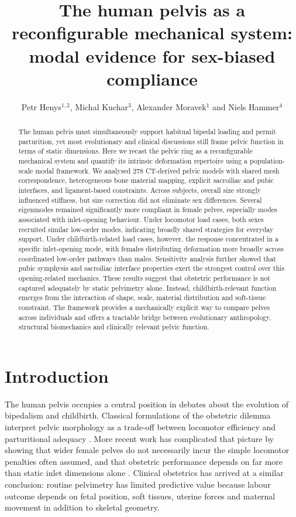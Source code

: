 \documentclass[fleqn,usenatbib]{rsproca_new}
\title[Reconfigurable mechanics of the human pelvis]{The human pelvis as a reconfigurable mechanical system: modal evidence for sex-biased compliance}
\author[Henys et al.]{
Petr Henys$^{1,2}$,
Michal Kuchar$^{3}$,
Alexander Moravek$^{1}$
and Niels Hammer$^{4}$
}
\begin{document}
\begin{abstract}
The human pelvis must simultaneously support habitual bipedal loading and permit parturition, yet most evolutionary and clinical discussions still frame pelvic function in terms of static dimensions. Here we recast the pelvic ring as a reconfigurable mechanical system and quantify its intrinsic deformation repertoire using a population-scale modal framework. We analysed 278 CT-derived pelvic models with shared mesh correspondence, heterogeneous bone material mapping, explicit sacroiliac and pubic interfaces, and ligament-based constraints. Across subjects, overall size strongly influenced stiffness, but size correction did not eliminate sex differences. Several eigenmodes remained significantly more compliant in female pelves, especially modes associated with inlet-opening behaviour. Under locomotor load cases, both sexes recruited similar low-order modes, indicating broadly shared strategies for everyday support. Under childbirth-related load cases, however, the response concentrated in a specific inlet-opening mode, with females distributing deformation more broadly across coordinated low-order pathways than males. Sensitivity analysis further showed that pubic symphysis and sacroiliac interface properties exert the strongest control over this opening-related mechanics. These results suggest that obstetric performance is not captured adequately by static pelvimetry alone. Instead, childbirth-relevant function emerges from the interaction of shape, scale, material distribution and soft-tissue constraint. The framework provides a mechanically explicit way to compare pelves across individuals and offers a tractable bridge between evolutionary anthropology, structural biomechanics and clinically relevant pelvic function.
\end{abstract}


\maketitle

\section{Introduction}
The human pelvis occupies a central position in debates about the evolution of bipedalism and childbirth. Classical formulations of the obstetric dilemma interpret pelvic morphology as a trade-off between locomotor efficiency and parturitional adequacy \citep{washburn1960,rosenberg1992,dunsworth2012}. More recent work has complicated that picture by showing that wider female pelves do not necessarily incur the simple locomotor penalties often assumed, and that obstetric performance depends on far more than static inlet dimensions alone \citep{warrener2015,betti2017,pavlicev2020}. Clinical obstetrics has arrived at a similar conclusion: routine pelvimetry has limited predictive value because labour outcome depends on fetal position, soft tissues, uterine forces and maternal movement in addition to skeletal geometry.
\end{document}
